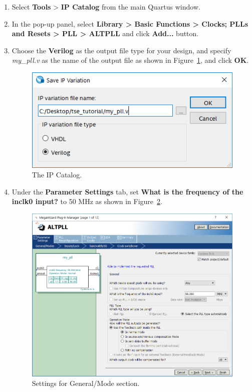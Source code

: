 \documentclass[11pt, twoside, pdftex]{article}
\begin{document}
\begin{enumerate}
	\item Select {\bf Tools} > {\bf IP Catalog} from the main Quartus window. %
	\item In the pop-up panel, select {\bf Library > Basic Functions > Clocks; PLLs and Resets > PLL > ALTPLL} and click {\bf Add...} button.
	\item Choose the {\bf Verilog} as the output file type for your design, and specify {\it my\_pll.v} as the name of the output file as shown in Figure~\ref{fig:pll_settings1}, and click {\bf OK}.
	
	\begin{figure}[H]
		\centering
		  \includegraphics[scale=0.65]{figures/pll_settings1.png}
		\caption{The IP Catalog.} 
		\label{fig:pll_settings1}
	\end{figure}

	\item Under the {\bf Parameter Settings} tab, set {\bf What is the frequency of the inclk0 input?} to 50 MHz as shown in Figure~\ref{fig:pll_settings2}.
	
	\begin{figure}[H]
		\centering
		  \includegraphics[scale=0.6]{figures/pll_settings2.png}
		\caption{Settings for General/Mode section.} 
		\label{fig:pll_settings2}
	\end{figure}
	

\end{enumerate}
\end{document}
